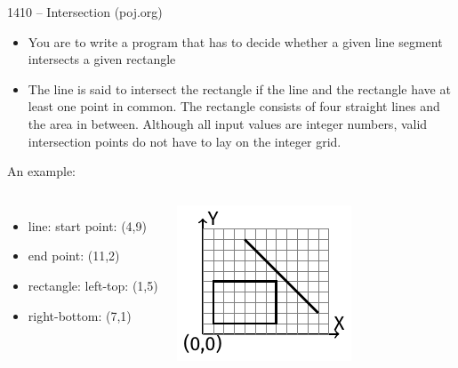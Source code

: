 \begin{frame}{1410 -- Intersection (poj.org)}
    \begin{itemize}
        \item You are to write a program that has to decide whether a given line segment intersects a given rectangle
        \item The line is said to intersect the rectangle if the line and the rectangle have at least one point in common. The rectangle consists of four straight lines and the area in between. Although all input values are integer numbers, valid intersection points do not have to lay on the integer grid.
    \end{itemize}  
    \begin{exampleblock}{An example:}
        \begin{columns}   
            \begin{itemize}
                \item line: start point: (4,9)
                \item end point: (11,2)
                \item rectangle: left-top: (1,5)
                \item right-bottom: (7,1)
            \end{itemize}
                \includegraphics{fig/9-4.pdf}
        \end{columns}
    \end{exampleblock}
\end{frame}
